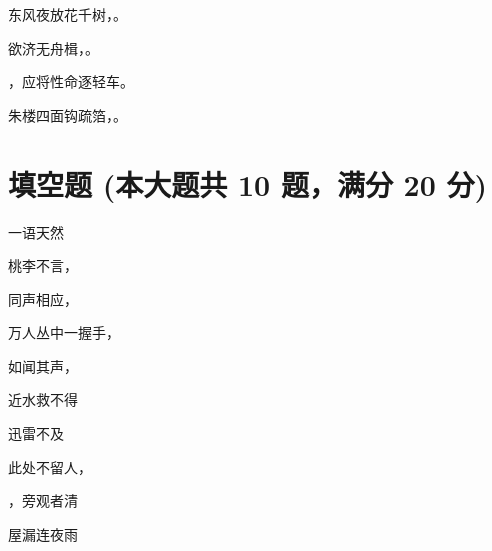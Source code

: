 \documentclass[12pt, a4paper, addpoints, answers]{exam}
\begin{document}
\begin{questions}
   

 

\question[3] 东风夜放花千树，\fillin 。

   

 

\question[3] 欲济无舟楫，\fillin 。

   

 

\question[3] \fillin ，应将性命逐轻车。

   

 

\question[3] 朱楼四面钩疏箔，\fillin 。

   

 
\end{questions}

\hspace{5cm}

\section{\normalsize{填空题 (本大题共 10 题，满分 20 分)}}
\hspace{1.5cm}
\begin{multicols}{2}
\begin{questions}
\question[2] 一语天然\fillin 

   

 

\question[2] 桃李不言，\fillin 

   

 

\question[2] 同声相应，\fillin 

   

 

\question[2] 万人丛中一握手，\fillin 

   

 

\question[2] 如闻其声，\fillin 

   

 

\question[2] 近水救不得\fillin 

   

 

\question[2] 迅雷不及\fillin 

   

 

\question[2] 此处不留人，\fillin 

   

 

\question[2] \fillin ，旁观者清

   

 

\question[2] 屋漏\fillin 连夜雨

   

 
\end{questions}
\end{multicols}
\end{document}
